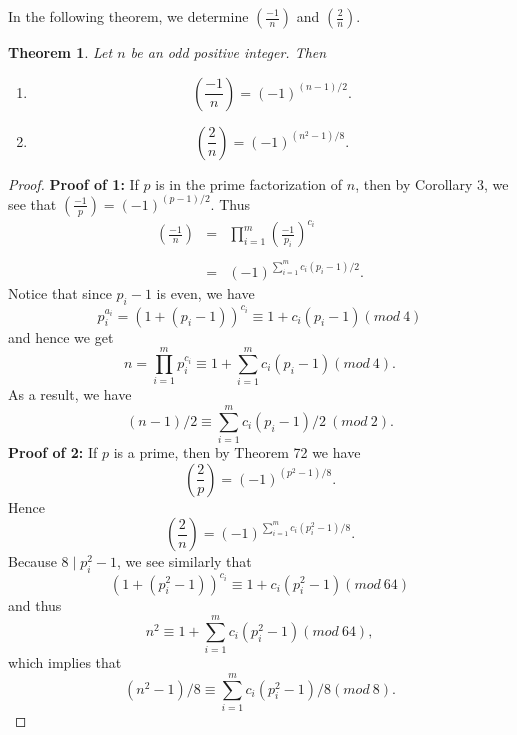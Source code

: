 \documentclass[12pt,letterpaper]{book}
\newtheorem{theorem}{Theorem}
\begin{document}
In the following theorem, we determine $\left(\frac{-1}{n}\right)$
and $\left(\frac{2}{n}\right)$.
\begin{theorem}
Let $n$ be an odd positive integer.  Then
\begin{enumerate}
\item{\begin{equation*}\left(\frac{-1}{n}\right)=(-1)^{(n-1)/2}.\end{equation*}}
\item{\begin{equation*}\left(\frac{2}{n}\right)=(-1)^{(n^2-1)/8}.\end{equation*}}
\end{enumerate}
\end{theorem}
\begin{proof}
\textbf{Proof of 1:}  If $p$ is in the prime factorization of $n$,
then by Corollary 3, we see that
$\left(\frac{-1}{p}\right)=(-1)^{(p-1)/2}$.  Thus
\begin{eqnarray*}
\left(\frac{-1}{n}\right)&=&\prod_{i=1}^m\left(\frac{-1}{p_i}\right)^{c_i}\\
\\ &=& (-1)^{\sum_{i=1}^mc_i(p_i-1)/2}.
\end{eqnarray*}
Notice that since $p_i-1$ is even, we have
\begin{equation*}
p_i^{a_i}=(1+(p_i-1))^{c_i}\equiv 1+c_i(p_i-1)(mod \ 4)
\end{equation*}
and hence we get
\begin{equation*}
n=\prod_{i=1}^mp_i^{c_i}\equiv 1+\sum_{i=1}^mc_i(p_i-1)(mod \ 4).
\end{equation*}
As a result, we have
\begin{equation*}
(n-1)/2\equiv \sum_{i=1}^mc_i(p_i-1)/2 \ (mod \ 2).
\end{equation*}
\textbf{Proof of 2:}  If $p$ is a prime, then by Theorem 72 we have
\begin{equation*}
\left(\frac{2}{p}\right)=(-1)^{(p^2-1)/8}.
\end{equation*}
Hence
\begin{equation*}
\left(\frac{2}{n}\right)=(-1)^{\sum_{i=1}^mc_i(p_i^2-1)/8}.
\end{equation*}
Because $8 \mid p_i^2-1$, we see similarly that
\begin{equation*}
(1+(p_i^2-1))^{c_i}\equiv 1+c_i(p_i^2-1)(mod \ 64)
\end{equation*}
and thus
\begin{equation*}
n^2\equiv 1+\sum_{i=1}^mc_i(p_i^2-1) (mod \ 64),
\end{equation*}
which implies that
\begin{equation*}
(n^2-1)/8\equiv \sum_{i=1}^mc_i(p_i^2-1)/8 (mod \ 8).
\end{equation*}
\end{proof}
\end{document}
